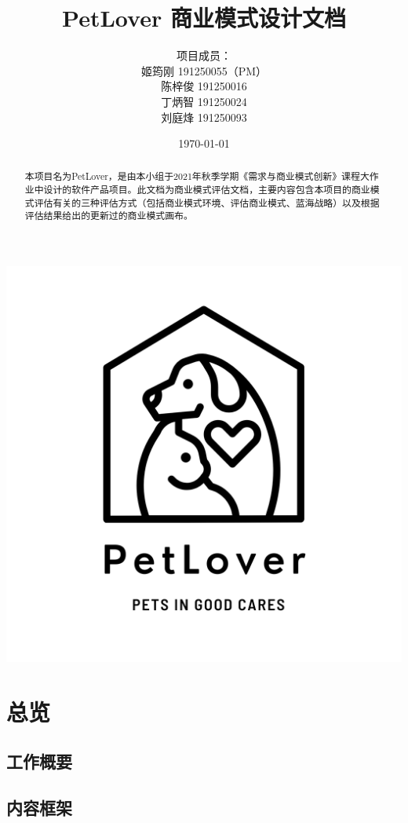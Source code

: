 \documentclass[a4paper]{ctexart}
\title{\Huge PetLover 商业模式设计文档}
\author{
  项目成员：\\
  姬筠刚 191250055（PM）\\
  陈梓俊 191250016\\
  丁炳智 191250024\\
  刘庭烽 191250093\\
}
\date{\today}
\begin{document}
\maketitle

\centerline{\includegraphics[]{logo.png}}

\newpage

\begin{abstract}
  本项目名为PetLover，是由本小组于2021年秋季学期《需求与商业模式创新》课程大作业中设计的软件产品项目。此文档为商业模式评估文档，主要内容包含本项目的商业模式评估有关的三种评估方式（包括商业模式环境、评估商业模式、蓝海战略）以及根据评估结果给出的更新过的商业模式画布。
\end{abstract}

\tableofcontents

\newpage

\setlength{\parskip}{1em}
\section{总览}
\subsection{工作概要}
\subsection{内容框架}
\end{document}
